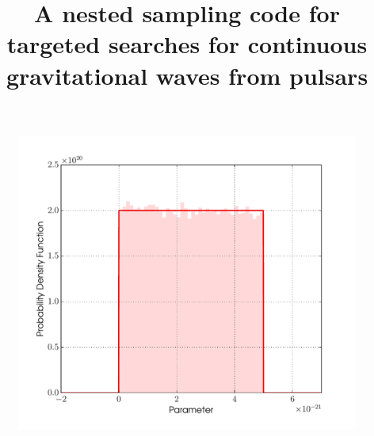




\title{A nested sampling code for targeted searches for continuous gravitational waves from pulsars
}
\begin{abstract}\end{abstract}





\begin{figure}[!phtb]
\begin{center}
\includegraphics[width=1\columnwidth]{./figures/priors/uniform/uniform}
\caption{ \protect}
\end{center}
\end{figure}


